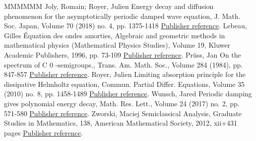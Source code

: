 \documentclass[11pt]{article}
\theoremstyle{definition}
\numberwithin{equation}{section}
\numberwithin{figure}{section}
\numberwithin{table}{section}
\newcommand{\1}{\mathds 1}
\begin{document}
\begin{thebibliography}{MMMMMM}
 Joly, Romain; Royer, Julien Energy decay and diffusion phenomenon for the asymptotically periodic damped wave equation, J. Math. Soc. Japan, Volume 70 (2018) no. 4, pp. 1375-1418 \href{https://ahl.centre-mersenne.org/item/AHL_2018__1__297_0/#JolyRo18}{Publisher reference}.
 Lebeau, Gilles Équation des ondes amorties, Algebraic and geometric methods in mathematical physics (Mathematical Physics Studies), Volume 19, Kluwer Academic Publishers, 1996, pp. 73-109 \href{https://ahl.centre-mersenne.org/item/AHL_2018__1__297_0/#Lebeau96}{Publisher reference}.
 Prüss, Jan On the spectrum of C 0 -semigroups., Trans. Am. Math. Soc., Volume 284 (1984), pp. 847-857 \href{https://ahl.centre-mersenne.org/item/AHL_2018__1__297_0/#Pruss84}{Publisher reference}.
 Royer, Julien Limiting absorption principle for the dissipative Helmholtz equation, Commun. Partial Differ. Equations, Volume 35 (2010) no. 8, pp. 1458-1489 \href{https://ahl.centre-mersenne.org/item/AHL_2018__1__297_0/#royer-mourre}{Publisher reference}.
 Wunsch, Jared Periodic damping gives polynomial energy decay, Math. Res. Lett., Volume 24 (2017) no. 2, pp. 571-580 \href{https://ahl.centre-mersenne.org/item/AHL_2018__1__297_0/#Wunsch}{Publisher reference}.
 Zworski, Maciej Semiclassical Analysis, Graduate Studies in Mathematics, 138, American Mathematical Society, 2012, xii+431 pages \href{https://ahl.centre-mersenne.org/item/AHL_2018__1__297_0/#zworski}{Publisher reference}.
\end{thebibliography}
\end{document}

